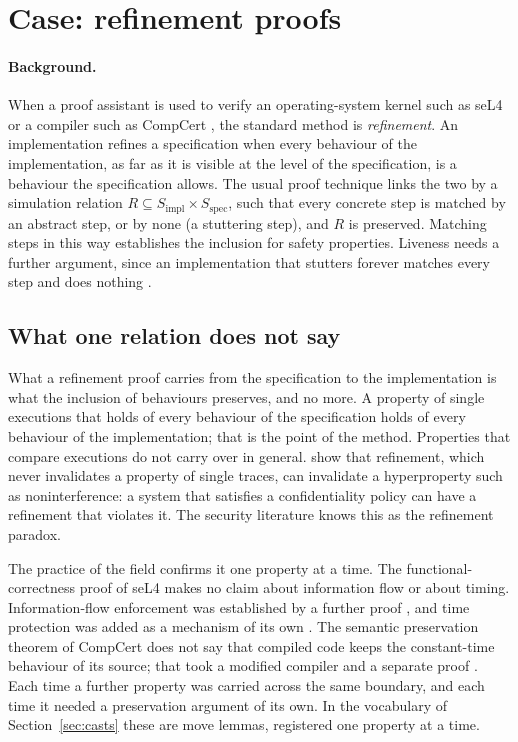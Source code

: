 \section{Case: refinement proofs}
\label{sec:refinement}

\paragraph{Background.} When a proof assistant is used to verify an operating-system
kernel such as seL4 \citep{klein2009} or a compiler such as CompCert \citep{leroy2009},
the standard method is \emph{refinement}. An implementation refines a specification when
every behaviour of the implementation, as far as it is visible at the level of the
specification, is a behaviour the specification allows. The usual proof technique links
the two by a simulation relation
$R \subseteq S_{\mathrm{impl}} \times S_{\mathrm{spec}}$, such that every concrete step
is matched by an abstract step, or by none (a stuttering step), and $R$ is preserved.
Matching steps in this way establishes the inclusion for safety properties. Liveness
needs a further argument, since an implementation that stutters forever matches every
step and does nothing \citep{abadi1991}.

\subsection{What one relation does not say}

What a refinement proof carries from the specification to the implementation is what the
inclusion of behaviours preserves, and no more. A property of single executions that
holds of every behaviour of the specification holds of every behaviour of the
implementation; that is the point of the method. Properties that compare executions do
not carry over in general. \citet{clarkson2010} show that refinement, which never
invalidates a property of single traces, can invalidate a hyperproperty such as
noninterference: a system that satisfies a confidentiality policy can have a refinement
that violates it. The security literature knows this as the refinement paradox.

The practice of the field confirms it one property at a time. The functional-correctness
proof of seL4 makes no claim about information flow or about timing. Information-flow
enforcement was established by a further proof \citep{murray2013}, and time protection
was added as a mechanism of its own \citep{ge2019}. The semantic preservation theorem of
CompCert does not say that compiled code keeps the constant-time behaviour of its source;
that took a modified compiler and a separate proof \citep{barthe2020}. Each time a
further property was carried across the same boundary, and each time it needed a
preservation argument of its own. In the vocabulary of Section~\ref{sec:casts} these are
move lemmas, registered one property at a time.

